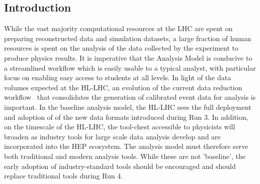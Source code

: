 




\subsection{Introduction}

While the vast majority computational resources at the LHC are spent on preparing reconstructed data and simulation datasets, a large fraction of human resources is spent on the analysis of the data collected by the experiment to produce physics results. It is imperative that the Analysis Model is conducive to a streamlined workflow which is easily usable to a typical analyst, with particular focus on enabling easy access to students at all levels. 
In light of the data volumes expected at the HL-LHC, an evolution of the current data reduction workflow~\cite{Derivation System} that consolidates the generation of  calibrated event data for analysis is important. In the baseline analysis model, the HL-LHC sees the full deployment and adoption of of the new data formats introduced during Run 3. In addition, on the timescale of the HL-LHC, the tool-chest accessible to physicists will broaden as industry tools for large scale data analysis develop and are incorporated into the HEP ecosystem. The analysis model must therefore serve both traditional and modern analysis tools. While these are not 'baseline', the early adoption of industry-standard tools should be encouraged and should replace traditional tools during Run 4.

